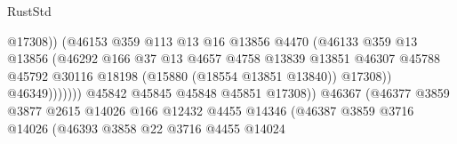 \begin{lexlean}{RustStd}
\begin{coremodule}
                                                  @17308))
                                              (@46153
                                                @359
                                                @113
                                                @13
                                                @16
                                                @13856
                                                @4470
                                                (@46133
                                                  @359
                                                  @13
                                                  @13856
                                                  (@46292
                                                    @166
                                                    @37
                                                    @13
                                                    @4657
                                                    @4758
                                                    @13839
                                                    @13851
                                                    @46307
                                                    @45788
                                                    @45792
                                                    @30116
                                                    @18198
                                                    (@15880 (@18554 @13851 @13840))
                                                    @17308))
                                                @46349)))))))
                                  @45842
                                  @45845
                                  @45848
                                  @45851
                                  @17308))
                              @46367
                              (@46377
                                @3859
                                @3877
                                @2615
                                @14026
                                @166
                                @12432
                                @4455
                                @14346
                                (@46387
                                  @3859
                                  @3716
                                  @14026
                                  (@46393
                                    @3858
                                    @22
                                    @3716
                                    @4455
                                    @14024

\end{coremodule}
\end{lexlean}
